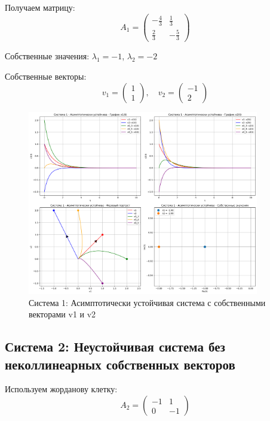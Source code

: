 Получаем матрицу:
\begin{equation}
A_1 = \begin{pmatrix} -\frac{4}{3} & \frac{1}{3} \\ \frac{2}{3} & -\frac{5}{3} \end{pmatrix}
\end{equation}

Собственные значения: $\lambda_1 = -1$, $\lambda_2 = -2$

Собственные векторы:
\begin{equation}
v_1 = \begin{pmatrix} 1 \\ 1 \end{pmatrix}, \quad v_2 = \begin{pmatrix} -1 \\ 2 \end{pmatrix}
\end{equation}

\begin{figure}[h!]
\centering
\includegraphics[width=0.9\textwidth]{images/task1/система_1_-_асимптотически_устойчива.png}
\caption{Система 1: Асимптотически устойчивая система с собственными векторами v1 и v2}
\label{fig:system1}
\end{figure}

\subsection{Система 2: Неустойчивая система без неколлинеарных собственных векторов}

Используем жорданову клетку:
\begin{equation}
A_2 = \begin{pmatrix} -1 & 1 \\ 0 & -1 \end{pmatrix}
\end{equation}

